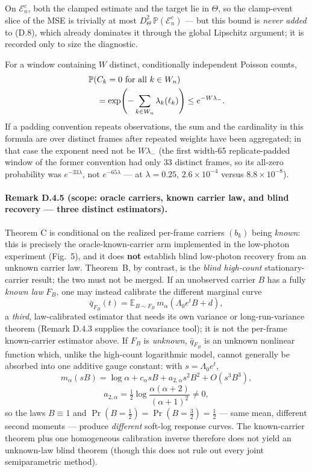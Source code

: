 On $\mathcal E_n^c$, both the clamped estimate and the target lie in
$\Theta$, so the clamp-event slice of the MSE is trivially at most
$D_\Theta^2\,\mathbb P(\mathcal E_n^c)$ --- but this bound is
\emph{never added} to (D.8), which already dominates it through the
global Lipschitz argument; it is recorded only to size the diagnostic.

For a window containing $W$ distinct, conditionally independent
Poisson counts,
\[
\begin{aligned}
&\mathbb P(C_k=0\ \hbox{for all }k\in W_n)\\
&\quad=\exp\!\left(-\sum_{k\in W_n}\lambda_k(\ell_k)\right)
\le e^{-W\lambda_-}.
\end{aligned}
\]
If a padding convention repeats observations, the sum and the
cardinality in this formula are over distinct frames after repeated
weights have been aggregated; in that case the exponent need not be
$W\lambda_-$ (the first width-65 replicate-padded window of the
former convention had only 33 distinct frames, so its all-zero
probability was $e^{-33\lambda}$, not $e^{-65\lambda}$ --- at
$\lambda=0.25$, $2.6\times10^{-4}$ versus $8.8\times10^{-8}$).

\paragraph{Remark D.4.5 (scope: oracle carriers, known carrier law, and blind recovery --- three distinct estimators).}
Theorem C is conditional on the realized per-frame carriers $(b_k)$ being \emph{known}: this is precisely the oracle-known-carrier arm implemented in the low-photon experiment (Fig.~5), and it does \textbf{not} establish blind low-photon recovery from an unknown carrier law. Theorem~B, by contrast, is the \emph{blind high-count} stationary-carrier result; the two must not be merged. If an unobserved carrier $B$ has a fully \emph{known law} $F_B$, one may instead calibrate the different marginal curve
\[
\bar q_{F_B}(t)=\mathbb E_{B\sim F_B}\,m_\alpha(\Lambda_0e^tB+d),
\]
a \emph{third}, law-calibrated estimator that needs its own variance or long-run-variance theorem (Remark D.4.3 supplies the covariance tool); it is not the per-frame known-carrier estimator above. If $F_B$ is \emph{unknown}, $\bar q_{F_B}$ is an unknown nonlinear function which, unlike the high-count logarithmic model, cannot generally be absorbed into one additive gauge constant: with $s=\Lambda_0e^t$,
\[
m_\alpha(sB)=\log\alpha+c_\alpha sB+a_{2,\alpha}s^2B^2+O(s^3B^3),
\]
\[
a_{2,\alpha}=\tfrac12\log\frac{\alpha(\alpha+2)}{(\alpha+1)^2}\ne0,
\]
so the laws $B\equiv1$ and $\Pr(B=\tfrac12)=\Pr(B=\tfrac32)=\tfrac12$ --- same mean, different second moments --- produce \emph{different} soft-log response curves. The known-carrier theorem plus one homogeneous calibration inverse therefore does not yield an unknown-law blind theorem (though this does not rule out every joint semiparametric method).

